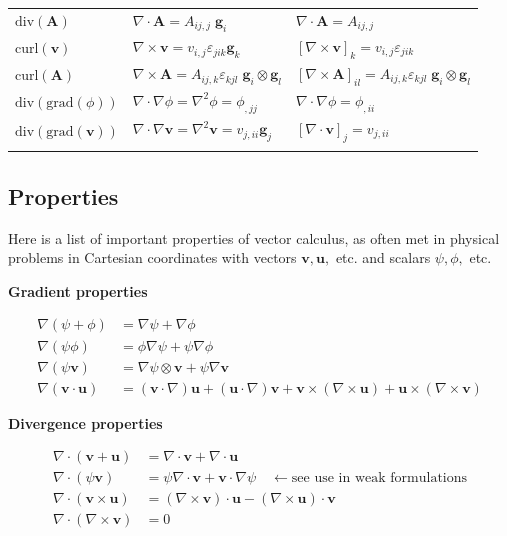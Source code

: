\documentclass{digitaldynamics}
\def\vect#1{\bm{#1}}
\def\tensor#1{\bm{#1}}
\begin{document}
\begin{table}[]
\begin{tabular}{lll}
\scriptsize $\mathrm{div}(\tensor{A})$     & $ \nabla \cdot \tensor{A} = A_{ij,j} \;\vect{g}_i$ &  $\nabla \cdot \tensor{A} = A_{ij,j}$ \\
\scriptsize $\mathrm{curl}(\vect{v})$      & $ \nabla \times \vect{v} = v_{i,j} \varepsilon_{jik} \vect{g}_k$ &  $  [\nabla \times \vect{v}]_k = v_{i,j} \varepsilon_{jik}$ \\
\scriptsize $\mathrm{curl}(\tensor{A})$    & $ \nabla \times \tensor{A} = A_{ij,k} \varepsilon_{kjl} \;\vect{g}_i \otimes \vect{g}_l$ &  $[\nabla \times \tensor{A}]_{il} = A_{ij,k} \varepsilon_{kjl} \;\vect{g}_i \otimes \vect{g}_l$ \\
\scriptsize $\mathrm{div} (\mathrm{grad} (\phi)) $     & $ \nabla \cdot \nabla \phi = \nabla^2 \phi = \phi_{,jj}$ &  $ \nabla \cdot \nabla \phi = \phi_{,ii}$ \\
\scriptsize $\mathrm{div} (\mathrm{grad} (\vect{v})) $ & $ \nabla \cdot \nabla \vect{v} = \nabla^2 \vect{v}  = v_{j,ii}  \vect{g}_j$ &  $ [\nabla \cdot \vect{v}]_j = v_{j,ii}$ \\
 &  \\ 
\hline\hline
\end{tabular}
\end{table}


\subsection{Properties}

Here is a list of important properties of vector calculus, as often met in physical problems in Cartesian coordinates with vectors $\mathbf{v},\mathbf{u},$ etc. and scalars $\psi, \phi,$ etc.


\textbf{Gradient properties}

\begin{align}
\nabla(\psi+\phi) &=\nabla\psi+\nabla\phi \\
\nabla(\psi \phi) &= \phi\nabla \psi  + \psi \nabla \phi \\
\nabla(\psi \mathbf{v} ) &= \nabla \psi \otimes \mathbf{v} + \psi \nabla \mathbf{v} \\
\nabla(\mathbf{v} \cdot \mathbf{u}) &= (\mathbf{v} \cdot \nabla)\mathbf{u} + (\mathbf{u} \cdot \nabla)\mathbf{v} + \mathbf{v} \times (\nabla \times \mathbf{u})
 + \mathbf{u} \times (\nabla \times \mathbf{v}) 
\end{align}

\textbf{Divergence properties}

\begin{align}
\nabla\cdot(\mathbf{v}+\mathbf{u}) &= \nabla\cdot\mathbf{v}+\nabla\cdot\mathbf{u} \\
\nabla\cdot\left(\psi\mathbf{v}\right) &= \psi\nabla\cdot\mathbf{v}+\mathbf{v}\cdot\nabla \psi \quad \leftarrow \textrm{see use in weak formulations} \\ 
\nabla\cdot\left(\mathbf{v}\times\mathbf{u}\right) &= (\nabla\times\mathbf{v})\cdot \mathbf{u}-(\nabla\times\mathbf{u})\cdot \mathbf{v}  \\
\nabla\cdot(\nabla \times \mathbf{v}) &= 0
\end{align}
\end{document}
